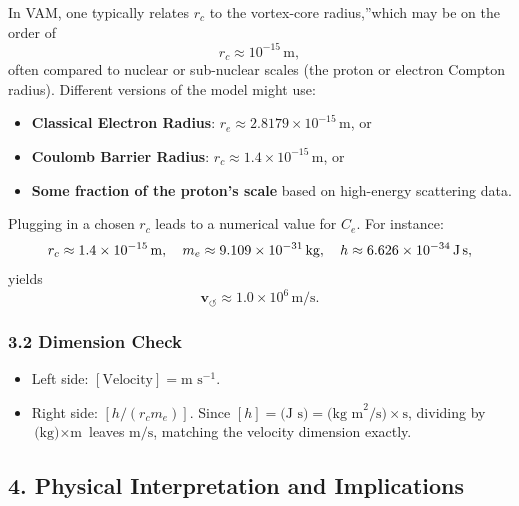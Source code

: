 \documentclass[a4paper,12pt]{article}
\begin{document}
In VAM, one typically relates \(r_c\) to the \grqq vortex-core radius,\textquotedblright which may be on the order of
\[
    r_c \approx 10^{-15}\,\text{m},
\]
often compared to nuclear or sub-nuclear scales (the proton or electron Compton radius). Different versions of the model might use:
\begin{itemize}
    \item \textbf{Classical Electron Radius}: \(r_e \approx 2.8179 \times 10^{-15}\,\mathrm{m}\), or
    \item \textbf{Coulomb Barrier Radius}: \(r_c \approx 1.4 \times 10^{-15}\,\mathrm{m}\), or
    \item \textbf{Some fraction of the proton's scale} based on high-energy scattering data.
\end{itemize}

Plugging in a chosen \(r_c\) leads to a numerical value for \(C_e\). For instance:
\[
    r_c \approx 1.4 \times 10^{-15}\,\text{m}, \quad m_e \approx 9.109 \times 10^{-31}\,\text{kg}, \quad h \approx 6.626 \times 10^{-34}\,\text{J\,s},
\]
yields
\[
    \mathbf{v}_{\scriptscriptstyle\boldsymbol{\circlearrowleft}} \approx 1.0 \times 10^6 \,\text{m/s}.
\]

\subsubsection*{3.2 Dimension Check}

\begin{itemize}
    \item Left side: \([\text{Velocity}] = \text{m s}^{-1}\).
    \item Right side: \([h/(r_c m_e)]\). Since \([h] = \text{(J s)} = \text{(kg m}^2\text{/s)}\times\text{s}\), dividing by \(\text{(kg)} \times \text{m}\) leaves \(\text{m}/\text{s}\), matching the velocity dimension exactly.
\end{itemize}

\subsection*{4. Physical Interpretation and Implications}
\end{document}
